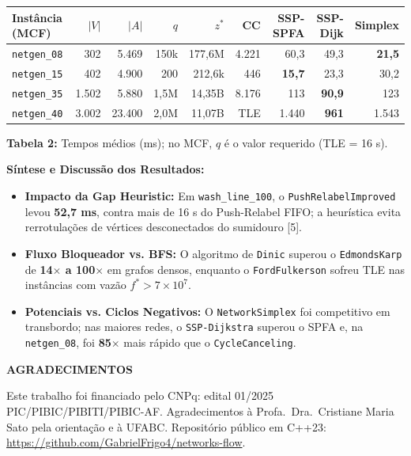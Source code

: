 \documentclass[final]{article}
\newcommand{\destaque}[1]{\textcolor{ufabcgreen}{\textbf{#1}}}
\newcommand{\postersection}[1]{
    \par\vspace{0.55em}
    {\fontsize{34}{40}\selectfont\bfseries\color{textdark}#1}
    \par\vspace{0.2em}
}
\newcommand{\postercaption}[2]{
    \par\vspace{0.22em}
    {\fontsize{25}{30}\selectfont\raggedright\textbf{#1:} #2\par}
    \vspace{0.3em}
}
\begin{document}
\begin{minipage}[t]{41.275cm}
{\vspace{0.35cm}

\begin{tabular*}{\linewidth}{@{\extracolsep{\fill}}lrrrr|rrrr@{}}
\toprule
\textbf{Instância (MCF)} & $|V|$ & $|A|$ & $q$ & $z^*$ & \textbf{CC} & \textbf{SSP-SPFA} & \textbf{SSP-Dijk} & \textbf{Simplex} \\
\midrule
\texttt{netgen\_08} & 302   & 5.469  & 150k & 177,6M & 4.221 & 60,3  & 49,3  & \destaque{21,5} \\
\texttt{netgen\_15} & 402   & 4.900  & 200  & 212,6k & 446   & \destaque{15,7}  & 23,3  & 30,2 \\
\texttt{netgen\_35} & 1.502 & 5.880  & 1,5M & 14,35B & 8.176 & 113   & \destaque{90,9}  & 123 \\
\texttt{netgen\_40} & 3.002 & 23.400 & 2,0M & 11,07B & TLE   & 1.440 & \destaque{961}   & 1.543 \\
\bottomrule
\end{tabular*}
}
\postercaption{Tabela 2}{Tempos médios (ms); no MCF, $q$ é o valor requerido (TLE = 16 s).}

\textbf{Síntese e Discussão dos Resultados:}
\begin{itemize}[leftmargin=1.2em, itemsep=0.18em, topsep=0.1em]
    \item \destaque{Impacto da Gap Heuristic:} Em \texttt{wash\_line\_100}, o \texttt{PushRelabelImproved} levou \textbf{52,7 ms}, contra mais de 16 s do Push-Relabel FIFO; a heurística evita rerrotulações de vértices desconectados do sumidouro [5].
    \item \destaque{Fluxo Bloqueador vs. BFS:} O algoritmo de \texttt{Dinic} superou o \texttt{EdmondsKarp} de \textbf{14$\times$ a 100$\times$} em grafos densos, enquanto o \texttt{FordFulkerson} sofreu TLE nas instâncias com vazão $f^* > 7 \times 10^7$.
    \item \destaque{Potenciais vs. Ciclos Negativos:} O \texttt{NetworkSimplex} foi competitivo em transbordo; nas maiores redes, o \texttt{SSP-Dijkstra} superou o SPFA e, na \texttt{netgen\_08}, foi \textbf{85$\times$} mais rápido que o \texttt{CycleCanceling}.
\end{itemize}

\postersection{AGRADECIMENTOS}
Este trabalho foi financiado pelo CNPq: edital 01/2025 PIC/PIBIC/PIBITI/PIBIC-AF. Agradecimentos à Profa.\ Dra.\ Cristiane Maria Sato pela orientação e à UFABC. Repositório público em C++23: \url{https://github.com/GabrielFrigo4/networks-flow}.


\end{minipage}
\end{document}
